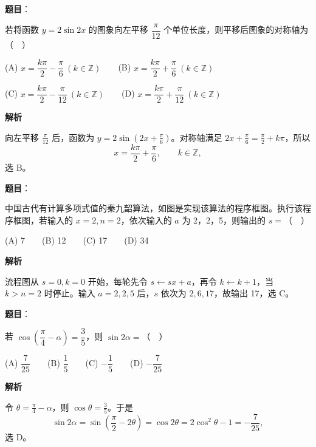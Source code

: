 \begin{answer}

\textbf{题目}：

若将函数 \(y=2\sin 2x\) 的图象向左平移 \(\dfrac{\pi}{12}\) 个单位长度，则平移后图象的对称轴为（　）

   (A) \(x=\dfrac{k\pi}{2}-\dfrac{\pi}{6}\ (k\in\mathbb Z)\)　　(B) \(x=\dfrac{k\pi}{2}+\dfrac{\pi}{6}\ (k\in\mathbb Z)\)

   (C) \(x=\dfrac{k\pi}{2}-\dfrac{\pi}{12}\ (k\in\mathbb Z)\)　　(D) \(x=\dfrac{k\pi}{2}+\dfrac{\pi}{12}\ (k\in\mathbb Z)\)

\textbf{解析}

向左平移 \(\frac{\pi}{12}\) 后，函数为 \(y=2\sin(2x+\frac{\pi}{6})\)。对称轴满足 \(2x+\frac{\pi}{6}=\frac{\pi}{2}+k\pi\)，所以
\nopagebreak[4]
\[
x=\frac{k\pi}{2}+\frac{\pi}{6},\qquad k\in\mathbb Z,
\]
选 B。


\end{answer}
\begin{answer}

\textbf{题目}：

中国古代有计算多项式值的秦九韶算法，如图是实现该算法的程序框图。执行该程序框图，若输入的 \(x=2,n=2\)，依次输入的 \(a\) 为 2，2，5，则输出的 \(s=\)（　）
\nopagebreak[4]
\begin{center}\end{center}
\nopagebreak[4]
   (A) 7　　(B) 12　　(C) 17　　(D) 34

\textbf{解析}

流程图从 \(s=0,k=0\) 开始，每轮先令 \(s\leftarrow sx+a\)，再令 \(k\leftarrow k+1\)，当 \(k>n=2\) 时停止。输入 \(a=2,2,5\) 后，\(s\) 依次为 \(2,6,17\)，故输出 17，选 C。


\end{answer}
\begin{answer}

\textbf{题目}：

若 \(\cos\left(\dfrac\pi4-\alpha\right)=\dfrac35\)，则 \(\sin 2\alpha=\)（　）

   (A) \(\dfrac7{25}\)　　(B) \(\dfrac15\)　　(C) \(-\dfrac15\)　　(D) \(-\dfrac7{25}\)

\textbf{解析}

令 \(\theta=\frac{\pi}{4}-\alpha\)，则 \(\cos\theta=\frac35\)。于是
\nopagebreak[4]
\[
\sin2\alpha=\sin\left(\frac\pi2-2\theta\right)=\cos2\theta
=2\cos^2\theta-1=-\frac7{25},
\]
选 D。


\end{answer}
